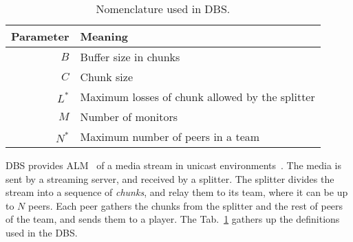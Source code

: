 
\label{sec:DBS}

\begin{table}
  \begin{tabular}{rl}
    Parameter & Meaning \\
    \hline
    $B$    & Buffer size in chunks \\
    $C$    & Chunk size \\
    $L^*$  & Maximum losses of chunk allowed by the splitter \\
    $M$    & Number of monitors \\
    $N^*$  & Maximum number of peers in a team
  \end{tabular}
  \caption{Nomenclature used in DBS.\label{tab:DBS_nomenclature}}
\end{table}

DBS provides ALM~\cite{banerjee2002scalable} of a media stream in
unicast environments~\cite{comer2003computer}. The media is sent by a
streaming server,
and received by a splitter. The
splitter divides the stream into a sequence of \emph{chunks}, and
relay them to its team, where it can be up to $N$ peers. Each peer
gathers the chunks from the splitter and the rest of peers of the
team, and sends them to a player. The Tab.~\ref{tab:DBS_nomenclature}
gathers up the definitions used in the DBS.
\begin{comment}
In single layered streams\footnote{Each layer of a
  scalable stream is received by a different peer attached to the same
  player capable or render scalable media.}, each peer is spawned by a
player (normal users should not run peers directly).
\end{comment}

\begin{comment}
/* quitar: We define the set of teams as
$\{T\}$,
and enumerate the peers in the team $T$ as $T=\{P_1,\cdots,P_{|T|}\}$. */
\end{comment}
